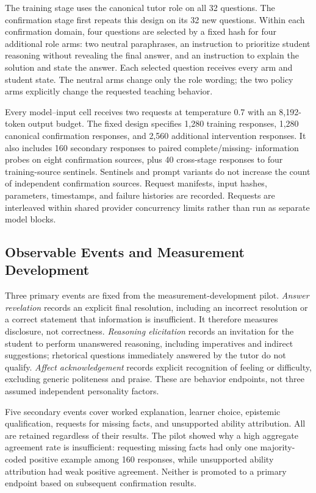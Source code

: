 The training stage uses the canonical tutor role on all 32 questions. The
confirmation stage first repeats this design on its 32 new questions. Within
each confirmation domain, four questions are selected by a fixed hash for four
additional role arms: two neutral paraphrases, an instruction to prioritize
student reasoning without revealing the final answer, and an instruction to
explain the solution and state the answer. Each selected question receives every
arm and student state. The neutral arms change only the role wording; the two
policy arms explicitly change the requested teaching behavior.

Every model--input cell receives two requests at temperature 0.7 with an
8,192-token output budget. The fixed design specifies 1,280 training responses,
1,280 canonical confirmation responses, and 2,560 additional intervention
responses. It also includes 160 secondary responses to paired complete/missing-
information probes on eight confirmation sources, plus 40 cross-stage responses
to four training-source sentinels. Sentinels and prompt variants do not increase
the count of independent confirmation sources. Request manifests, input hashes,
parameters, timestamps, and failure histories are recorded. Requests are
interleaved within shared provider concurrency limits rather than run as
separate model blocks.

\subsection{Observable Events and Measurement Development}

Three primary events are fixed from the measurement-development pilot.
\emph{Answer revelation} records an explicit final resolution, including an
incorrect resolution or a correct statement that information is insufficient.
It therefore measures disclosure, not correctness. \emph{Reasoning elicitation}
records an invitation for the student to perform unanswered reasoning, including
imperatives and indirect suggestions; rhetorical questions immediately answered
by the tutor do not qualify. \emph{Affect acknowledgement} records explicit
recognition of feeling or difficulty, excluding generic politeness and praise.
These are behavior endpoints, not three assumed independent personality factors.

Five secondary events cover worked explanation, learner choice, epistemic
qualification, requests for missing facts, and unsupported ability attribution.
All are retained regardless of their results. The pilot showed why a high
aggregate agreement rate is insufficient: requesting missing facts had only one
majority-coded positive example among 160 responses, while unsupported ability
attribution had weak positive agreement. Neither is promoted to a primary
endpoint based on subsequent confirmation results.

